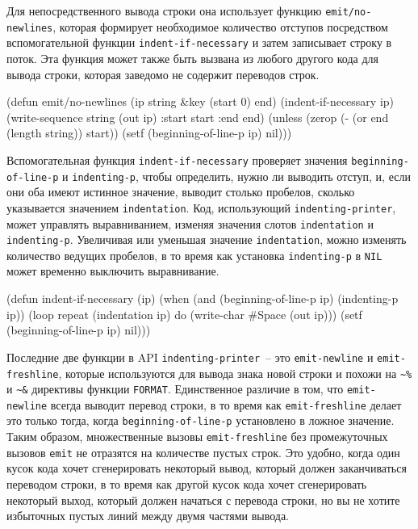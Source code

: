 Для непосредственного вывода строки она использует функцию \lstinline{emit/no-newlines},
которая формирует необходимое количество отступов посредством вспомогательной функции
\lstinline{indent-if-necessary} и затем записывает строку в поток.  Эта функция может также
быть вызвана из любого другого кода для вывода строки, которая заведомо не содержит
переводов строк.

\begin{myverb}
(defun emit/no-newlines (ip string &key (start 0) end)
  (indent-if-necessary ip)
  (write-sequence string (out ip) :start start :end end)
  (unless (zerop (- (or end (length string)) start))
    (setf (beginning-of-line-p ip) nil)))
\end{myverb}

Вспомогательная функция \lstinline{indent-if-necessary} проверяет значения
\lstinline{beginning-of-line-p} и \lstinline{indenting-p}, чтобы определить, нужно ли
выводить отступ, и, если они оба имеют истинное значение, выводит столько пробелов,
сколько указывается значением \lstinline{indentation}. Код, использующий
\lstinline{indenting-printer}, может управлять выравниванием, изменяя значения слотов
\lstinline{indentation} и \lstinline{indenting-p}. Увеличивая или уменьшая значение
\lstinline{indentation}, можно изменять количество ведущих пробелов, в то время как
установка \lstinline{indenting-p} в \lstinline{NIL} может временно выключить выравнивание.

\begin{myverb}
(defun indent-if-necessary (ip)
  (when (and (beginning-of-line-p ip) (indenting-p ip))
    (loop repeat (indentation ip) do (write-char #\bslash{}Space (out ip)))
    (setf (beginning-of-line-p ip) nil)))
\end{myverb}

Последние две функции в API \lstinline{indenting-printer}~-- это \lstinline{emit-newline} и
\lstinline{emit-freshline}, которые используются для вывода знака новой строки и похожи на
\lstinline!~%! и \lstinline!~&! директивы функции \lstinline{FORMAT}. Единственное различие в
том, что \lstinline{emit-newline} всегда выводит перевод строки, в то время как
\lstinline{emit-freshline} делает это только тогда, когда \lstinline{beginning-of-line-p}
установлено в ложное значение. Таким образом, множественные вызовы \lstinline{emit-freshline}
без промежуточных вызовов \lstinline{emit} не отразятся на количестве пустых строк. Это удобно,
когда один кусок кода хочет сгенерировать некоторый вывод, который должен заканчиваться
переводом строки, в то время как другой кусок кода хочет сгенерировать некоторый выход,
который должен начаться с перевода строки, но вы не хотите избыточных пустых линий между
двумя частями вывода.


